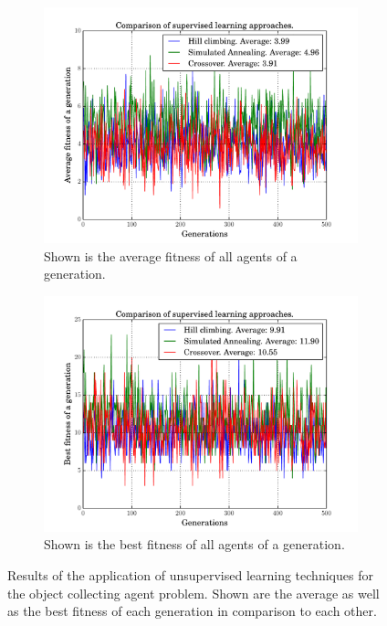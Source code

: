 \documentclass[10pt,a4paper,DIV=11]{scrreprt}
\begin{document}
\begin{figure}[H]
\centering
\begin{subfigure}{\textwidth}
  \centering
  \includegraphics[width=0.8\linewidth]{files/unsupervised/sub_average.pdf}
  \caption{Shown is the average fitness of all agents of a generation.}
  \label{fig:ua}
\end{subfigure}%
\newline
\begin{subfigure}{\textwidth}
  \centering
  \includegraphics[width=0.8\linewidth]{files/unsupervised/sub_best.pdf}
  \caption{Shown is the best fitness of all agents of a generation.}
  \label{fig:ub}
\end{subfigure}
\newline
\caption{Results of the application of unsupervised learning techniques for the object collecting agent problem.
         Shown are the average as well as the best fitness of each generation in comparison to each other.}
\label{fig:u}
\end{figure}
\end{document}
